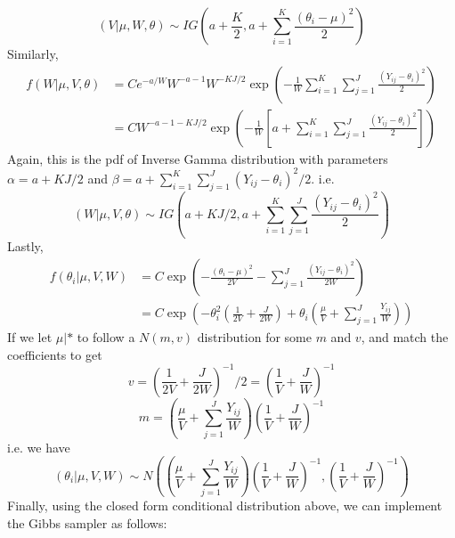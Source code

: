 $$(V|\mu,W,\theta)\sim IG\left(a+\frac{K}{2}, a+\sum\limits_{i=1}^K\frac{(\theta_i-\mu)^2}{2}\right)$$
Similarly, 
\begin{align*}
f(W|\mu,V,\theta) &= Ce^{-a/W}W^{-a-1}W^{-KJ/2}\exp\left(-\frac{1}{W}\sum\limits_{i=1}^K\sum\limits_{j=1}^J\frac{(Y_{ij}-\theta_i)^2}{2}\right)\\
  &=CW^{-a-1-KJ/2}\exp\left(-\frac{1}{W}\left[a+\sum\limits_{i=1}^K\sum\limits_{j=1}^J\frac{(Y_{ij}-\theta_i)^2}{2}\right]\right)
  \end{align*}
Again, this is the pdf of Inverse Gamma distribution with parameters $\alpha = a+KJ/2$ and $\beta=a+\sum_{i=1}^K\sum_{j=1}^J(Y_{ij}-\theta_i)^2/2$. i.e.
$$(W|\mu,V,\theta)\sim IG\left(a+KJ/2,a+\sum\limits_{i=1}^K\sum\limits_{j=1}^J\frac{(Y_{ij}-\theta_i)^2}{2}\right)$$
Lastly, 
\begin{align*}
f(\theta_i|\mu,V,W) &= C\exp\left(-\frac{(\theta_i-\mu)^2}{2V}-\sum\limits_{j=1}^J\frac{(Y_{ij}-\theta_i)^2}{2W}\right)\\
  &=C\exp\left(-\theta_i^2\left(\frac{1}{2V}+\frac{J}{2W}\right)+\theta_i\left(\frac{\mu}{V}+\sum\limits_{j=1}^J\frac{Y_{ij}}{W}\right)\right)
\end{align*}
If we let $\mu|*$ to follow a $N(m,v)$ distribution for some $m$ and $v$, and match the coefficients to get
$$v = \left(\frac{1}{2V}+\frac{J}{2W}\right)^{-1}\bigg/ 2 = \left(\frac{1}{V}+\frac{J}{W}\right)^{-1}$$
$$m = \left(\frac{\mu}{V} + \sum\limits_{j=1}^J\frac{Y_{ij}}{W}\right)\left(\frac{1}{V}+\frac{J}{W}\right)^{-1}$$
i.e. we have 
$$(\theta_i|\mu,V,W)\sim N\left(\left(\frac{\mu}{V} + \sum\limits_{j=1}^J\frac{Y_{ij}}{W}\right)\left(\frac{1}{V}+\frac{J}{W}\right)^{-1},\left(\frac{1}{V}+\frac{J}{W}\right)^{-1}\right)$$
Finally, using the closed form conditional distribution above, we can implement the Gibbs sampler as follows:

